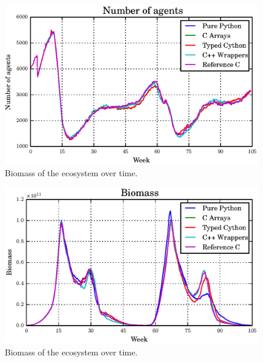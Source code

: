 \documentclass[12pt, a4paper]{report}
\begin{document}
\begin{appendices}
\begin{figure}[H]
  \begin{center}
    \includegraphics[width=\columnwidth]{graphs/ag-fixed-single-float-comp.eps}
    \caption{Biomass of the ecosystem over time.}
    \label{fig:master-bio}
  \end{center}
\end{figure}

\begin{figure}[H]
  \begin{center}
    \includegraphics[width=\columnwidth]{graphs/bio-fixed-single-double-comp.eps}
    \caption{Biomass of the ecosystem over time.}
    \label{fig:master-bio}
  \end{center}
\end{figure}


\end{appendices}
\end{document}
